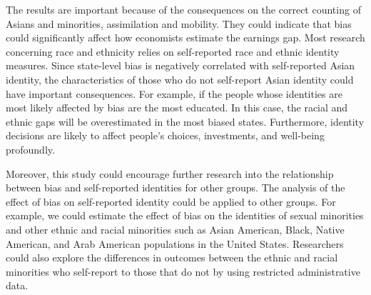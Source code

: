 The results are important because of the consequences on the correct counting of Asians and minorities, assimilation and mobility. They could indicate that bias could significantly affect how economists estimate the earnings gap. Most research concerning race and ethnicity relies on self-reported race and ethnic identity measures. Since state-level bias is negatively correlated with self-reported Asian identity, the characteristics of those who do not self-report Asian identity could have important consequences. For example, if the people whose identities are most likely affected by bias are the most educated. In this case, the racial and ethnic gaps will be overestimated in the most biased states. Furthermore, identity decisions are likely to affect people's choices, investments, and well-being profoundly. 

Moreover, this study could encourage further research into the relationship between bias and self-reported identities for other groups. The analysis of the effect of bias on self-reported identity could be applied to other groups. For example, we could estimate the effect of bias on the identities of sexual minorities and other ethnic and racial minorities such as Asian American, Black, Native American, and Arab American populations in the United States. Researchers could also explore the differences in outcomes between the ethnic and racial minorities who self-report to those that do not by using restricted administrative data. 
